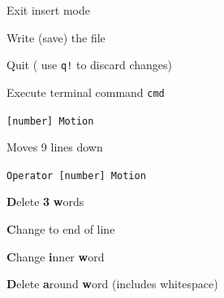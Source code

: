 \documentclass[12pt, a4paper]
{article}
\begin{document}
\begin{multicols}{3}

\begin{description}[nolistsep]
	\item[Esc] Exit insert mode
	\item[:w] Write (save) the file
	\item[:q] Quit ( use \texttt{q!} to discard changes)
	\item[:!<cmd>] Execute terminal command \texttt{cmd}
\end{description}

\begin{description}[nolistsep]
	\item[] \verb|[number] Motion|
	\item[9j] Moves 9 lines down
	\item[] \verb|Operator [number] Motion|
	\item[d3w] \textbf{D}elete \textbf{3} \textbf{w}ords
	\item[c\$] \textbf{C}hange to end of line
	\item[ciw] \textbf{C}hange \textbf{i}nner \textbf{w}ord
	\item[daw] \textbf{D}elete \textbf{a}round \textbf{w}ord (includes whitespace)
\end{description}
\end{multicols}
\end{document}
